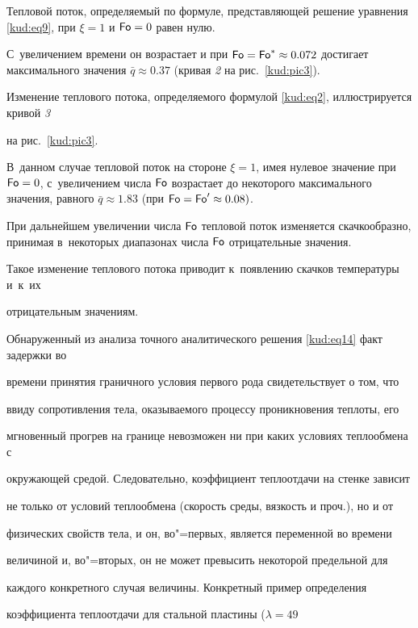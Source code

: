 Тепловой поток, определяемый по формуле, представляющей решение уравнения \eqref{kud:eq9}, при $\xi =1$ и $\operatorname{\sf Fo}=0$ равен нулю. 

С~увеличением времени он возрастает и при $\operatorname{\sf Fo}=\operatorname{\sf Fo}^{\ast }\approx 0.072$ достигает максимального значения $\bar {q}\approx 0.37$ (кривая {\sl 2} на рис.~\ref{kud:pic3}).



Изменение теплового потока, определяемого формулой \eqref{kud:eq2}, иллюстрируется кривой {\sl 3}

на рис.~\ref{kud:pic3}. 

В~данном случае тепловой поток на стороне $\xi =1$, имея нулевое значение при $\operatorname{\sf Fo}=0$, с~увеличением числа $\operatorname{\sf Fo}$ возрастает до некоторого максимального значения, равного $\bar {q} \approx 1.83$ (при $\operatorname{\sf Fo}= \operatorname{\sf Fo}'\approx 0.08)$. 

При дальнейшем увеличении числа $\operatorname{\sf Fo}$ тепловой поток изменяется скачкообразно, принимая в~некоторых диапазонах числа $\operatorname{\sf Fo}$ отрицательные значения. 

Такое изменение теплового потока приводит к~появлению скачков температуры и~к~их

отрицательным значениям.



Обнаруженный из анализа точного аналитического решения \eqref{kud:eq14} факт задержки во

времени принятия граничного условия первого рода свидетельствует о том, что

ввиду сопротивления тела, оказываемого процессу проникновения теплоты, его

мгновенный прогрев на границе невозможен ни при каких условиях теплообмена с

окружающей средой. Следовательно, коэффициент теплоотдачи на стенке зависит

не только от условий теплообмена (скорость среды, вязкость и проч.), но и от

физических свойств тела, и он, во"=первых, является переменной во времени

величиной и, во"=вторых, он не может превысить некоторой предельной для

каждого конкретного случая величины. Конкретный пример определения

коэффициента теплоотдачи для стальной пластины ($ \lambda =49$

